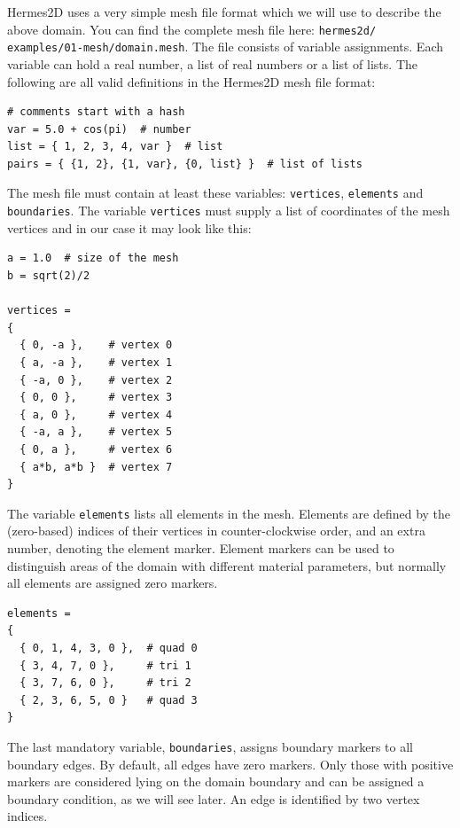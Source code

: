 Hermes2D uses a very simple mesh file format which we will use to describe the above
domain. You can find the complete mesh file here: {\tt hermes2d/ examples/01-mesh/domain.mesh}. 
The file consists of variable assignments. Each variable can hold a real number,
a list of real numbers or a list of lists. The following are all valid definitions
in the Hermes2D mesh file format:

\lstset{language=make}
\begin{lstlisting}
# comments start with a hash
var = 5.0 + cos(pi)  # number
list = { 1, 2, 3, 4, var }  # list
pairs = { {1, 2}, {1, var}, {0, list} }  # list of lists
\end{lstlisting}

The mesh file must contain at least these variables: {\tt vertices}, {\tt elements} and
{\tt boundaries}. The variable {\tt vertices} must supply a list of coordinates of the
mesh vertices and in our case it may look like this:

\begin{lstlisting}
a = 1.0  # size of the mesh
b = sqrt(2)/2

vertices =
{
  { 0, -a },    # vertex 0
  { a, -a },    # vertex 1
  { -a, 0 },    # vertex 2
  { 0, 0 },     # vertex 3
  { a, 0 },     # vertex 4
  { -a, a },    # vertex 5
  { 0, a },     # vertex 6
  { a*b, a*b }  # vertex 7
}
\end{lstlisting}

The variable {\tt elements} lists all elements in the mesh.
Elements are defined by the (zero-based) indices of their vertices in
counter-clockwise order, and an extra number, denoting the element marker.
Element markers can be used to distinguish areas of the domain with different
material parameters, but normally all elements are assigned zero markers.

\begin{lstlisting}
elements =
{
  { 0, 1, 4, 3, 0 },  # quad 0
  { 3, 4, 7, 0 },     # tri 1 
  { 3, 7, 6, 0 },     # tri 2
  { 2, 3, 6, 5, 0 }   # quad 3
}
\end{lstlisting}

The last mandatory variable, {\tt boundaries}, assigns boundary markers to
all boundary edges. By default, all edges have zero markers. Only those with
positive markers are considered lying on the domain boundary and can be
assigned a boundary condition, as we will see later.
An edge is identified by two vertex indices.

